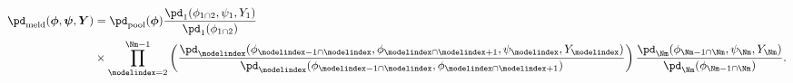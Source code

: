   \begin{equation}
  \begin{aligned}
  \pd_{\text{meld}} (\boldsymbol{\phi}, \boldsymbol{\psi}, \boldsymbol{Y}) &=
    \pd_{\text{pool}}(\boldsymbol{\phi})   
    \frac {
      \pd_{1} (\phi_{1 \cap 2}, \psi_{1}, Y_{1})
    } {
      \pd_{1}(\phi_{1 \cap 2})
    } \\
    &\times \prod_{\modelindex = 2}^{\Nm - 1} \left(
      \frac {
        \pd_{\modelindex} (\phi_{\modelindex - 1 \cap \modelindex}, \phi_{\modelindex \cap \modelindex + 1}, \psi_{\modelindex}, Y_{\modelindex})
      } {
        \pd_{\modelindex}(\phi_{\modelindex - 1 \cap \modelindex}, \phi_{\modelindex \cap \modelindex + 1})
      }
    \right)
    \frac {
      \pd_{\Nm} (\phi_{\Nm - 1 \cap \Nm}, \psi_{\Nm}, Y_{\Nm})
    } {
      \pd_{\Nm}(\phi_{\Nm - 1 \cap \Nm})
    }.
  \end{aligned}
  \label{eqn:melded-model-general}
\end{equation}